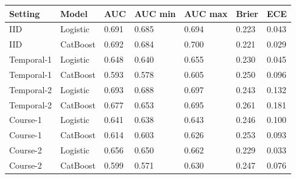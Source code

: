 \begin{tabular}{lllllll}
\toprule
Setting & Model & AUC & AUC min & AUC max & Brier & ECE\\
\midrule
IID & Logistic & 0.691 & 0.685 & 0.694 & 0.223 & 0.043\\
IID & CatBoost & 0.692 & 0.684 & 0.700 & 0.221 & 0.029\\
Temporal-1 & Logistic & 0.648 & 0.640 & 0.655 & 0.230 & 0.045\\
Temporal-1 & CatBoost & 0.593 & 0.578 & 0.605 & 0.250 & 0.096\\
Temporal-2 & Logistic & 0.693 & 0.688 & 0.697 & 0.243 & 0.132\\
Temporal-2 & CatBoost & 0.677 & 0.653 & 0.695 & 0.261 & 0.181\\
Course-1 & Logistic & 0.641 & 0.638 & 0.643 & 0.246 & 0.100\\
Course-1 & CatBoost & 0.614 & 0.603 & 0.626 & 0.253 & 0.093\\
Course-2 & Logistic & 0.656 & 0.650 & 0.662 & 0.229 & 0.033\\
Course-2 & CatBoost & 0.599 & 0.571 & 0.630 & 0.247 & 0.076\\
\bottomrule
\end{tabular}